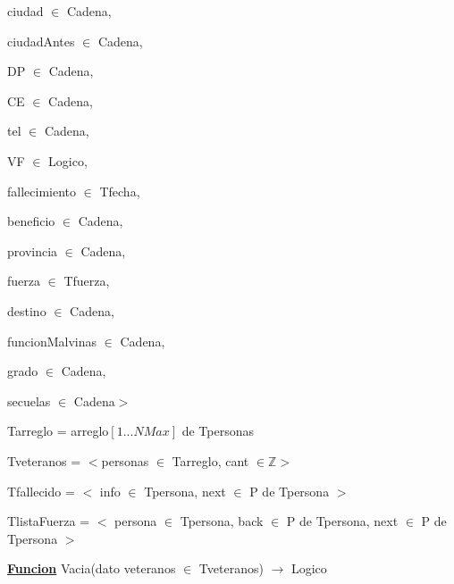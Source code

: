 \documentclass{article}
\begin{document}
        \hspace{8mm}ciudad $\in$ Cadena, 

        \hspace{8mm}ciudadAntes $\in$ Cadena, 
        
        \hspace{8mm}DP $\in$ Cadena, 
        
        \hspace{8mm}CE $\in$ Cadena, 
        
        \hspace{8mm}tel $\in$ Cadena, 
        
        \hspace{8mm}VF $\in$ Logico, 
        
        \hspace{8mm}fallecimiento $\in$ Tfecha,

        \hspace{8mm}beneficio $\in$ Cadena,

        \hspace{8mm}provincia $\in$ Cadena,

        \hspace{8mm}fuerza $\in$ Tfuerza,

        \hspace{8mm}destino $\in$ Cadena,

        \hspace{8mm}funcionMalvinas $\in$ Cadena,

        \hspace{8mm}grado $\in$ Cadena,

        \hspace{8mm}secuelas $\in$ Cadena$>$

    \hspace{4mm}Tarreglo = arreglo$[1...NMax]$ de Tpersonas

    \hspace{4mm}Tveteranos = $<$personas $\in$ Tarreglo, cant $\in \mathbb{Z}$$>$

    \hspace{4mm}Tfallecido = $<$ info $\in$ Tpersona, next $\in$ P de Tpersona $>$

    \hspace{4mm}TlistaFuerza = $<$ persona $\in$ Tpersona, back $\in$ P de Tpersona, next $\in$ P de Tpersona $>$

    \vspace{4mm}

    \hspace{4mm}\underline{\textbf{Funcion}} Vacia(dato veteranos $\in$ Tveteranos) $\rightarrow$ Logico
\end{document}
